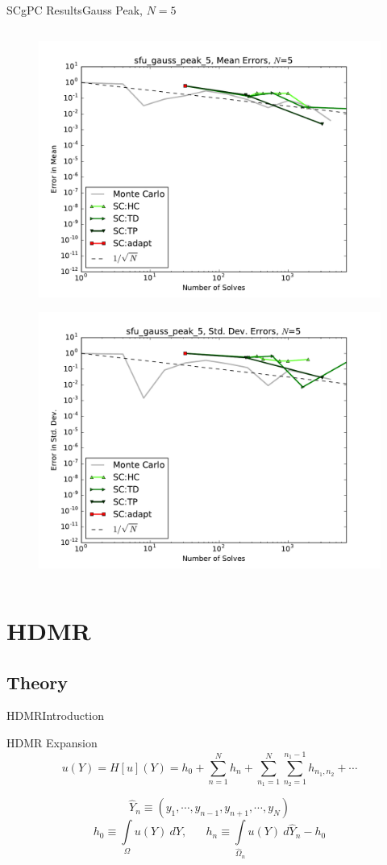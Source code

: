 \documentclass{beamer}
\begin{document}
\begin{frame}{SCgPC Results}{Gauss Peak, $N=5$}
\begin{columns}
\begin{column}{0.5\textwidth}
\begin{figure}[h!]
          \includegraphics[width=0.8\linewidth]{anlmodels/sfu_gauss_peak_5_mean_errs_nohdmr}
        \end{figure}
        \vspace{-20pt}
        \begin{figure}[h!]
          \centering
          \includegraphics[width=0.8\linewidth]{anlmodels/sfu_gauss_peak_5_variance_errs_nohdmr}
        \end{figure}
   \end{column}
 \end{columns}
\end{frame}


\section{HDMR}
\subsection{Theory}
\begin{frame}{HDMR}{Introduction}%
  \begin{block}{HDMR Expansion}
    \[u(Y) = H[u](Y) = h_0 + \sum_{n=1}^N h_n + \sum_{n_1=1}^N\sum_{n_2=1}^{n_1-1} h_{n_1,n_2}+\cdots\]
  \end{block}
  \[\hat Y_n \equiv (y_1,\cdots,y_{n-1},y_{n+1},\cdots,y_N)\]
  \[h_0 \equiv \int\limits_\Omega u(Y)\ dY, \hspace{20pt} h_n \equiv \int\limits_{\hat\Omega_n} u(Y)\ d\hat Y_n - h_0\]
\end{frame}
\end{document}
